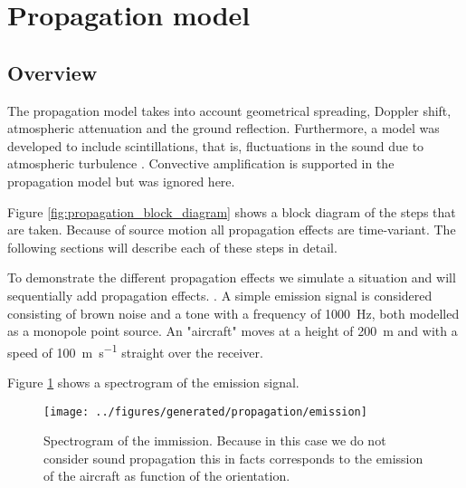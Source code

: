 \newpage\section{Propagation model}

\subsection{Overview}
The propagation model takes into account geometrical spreading, Doppler shift,
atmospheric attenuation and the ground reflection. Furthermore, a model was
developed to include scintillations, that is, fluctuations in the sound due to atmospheric
turbulence \cite{Rietdijk2017}. Convective amplification is supported in the
propagation model but was ignored here.

Figure \ref{fig:propagation_block_diagram} shows a block diagram of the steps
that are taken. Because of source motion all propagation effects are
time-variant. The following sections will describe each of these steps in
detail.

To demonstrate the different propagation effects we simulate a situation and
will sequentially add propagation effects. . A simple
emission signal is considered consisting of brown noise and a tone with a
frequency of \SI{1000}{\hertz}, both modelled as a monopole point source. An
"aircraft" moves at a height of \SI{200}{\meter} and with a speed of
\SI{100}{\meter\per\second} straight over the receiver.

Figure \ref{fig:implementation:propagation:emission} shows a spectrogram of the
emission signal.

\begin{figure}[H]
  \centering
  \texttt{[image: ../figures/generated/propagation/emission]}
  \caption{Spectrogram of the immission. Because in this case we do not consider sound propagation this in facts corresponds to the emission of the aircraft as function of the orientation.}
  \label{fig:implementation:propagation:emission}
\end{figure}

